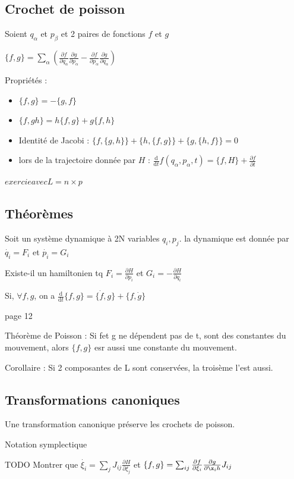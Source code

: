 \documentclass[french]{yLectureNote}
\newcommand{\dd}{\mathrm{d}}
\begin{document}
\subsection{Crochet de poisson}
Soient $q_\alpha$ et $p_{\beta}$ et 2 paires de fonctions $f$ et $g$
\begin{definition}
    $\{f,g\} = \sum_{\alpha} (\frac{\partial f}{\partial q_{\alpha}}\frac{\partial g}{\partial p_{\alpha}}-\frac{\partial f}{\partial p_{\alpha}}\frac{\partial g}{\partial q_{\alpha}})$
\end{definition}
Propriétés :
\begin{itemize}
    \item $\{f,g\} = - \{g,f\}$
    \item $\{f,gh\} = h\{f,g\} + g\{f,h\}$
    \item Identité de Jacobi : $\{f, \{g,h\}\}+ \{h, \{f,g\}\} + \{g, \{h,f\}\} = 0$
    \item lors de la trajectoire donnée par $H$ : $\frac{\dd }{\dd t}f(q_{\alpha}, p_{\alpha},t) = \{f, H\}+\frac{\partial f}{\partial t}$
\end{itemize}
$exercie avec L = n\times p$ 
\subsection{Théorèmes}
Soit un système dynamique à 2N variables $q_i, p_j$. la dynamique est donnée par $\dot{q_i} = F_i$ et $\dot{p_i} = G_i$

Existe-il un hamiltonien tq $F_i = \frac{\partial H}{\partial p_i}$ et $G_i =- \frac{\partial H}{\partial q_i}$

Si, $\forall f,g$, on a $\frac{\dd }{\dd t}\{f,g\} = \{\dot{f}, g\}+\{f,\dot{g}\}$

page 12

Théorème de Poisson :
Si fet g ne dépendent pas de t, sont des constantes du mouvement, alors $\{f,g\}$ esr aussi une constante du mouvement.

Corollaire : Si 2 composantes de L sont conservées, la troisème l'est aussi.

\subsection{Transformations canoniques}
Une transformation canonique préserve les crochets de poisson.

Notation symplectique

TODO 
Montrer que $\dot{\xi_i} = \sum_j  J_{ij}\frac{\partial H}{\partial \xi_j}$ et $\{f,g\} = \sum_{ij} \frac{\partial f}{\partial \xi_i}\frac{\partial g}{\partial \x_ih}J_{ij}$
\end{document}
